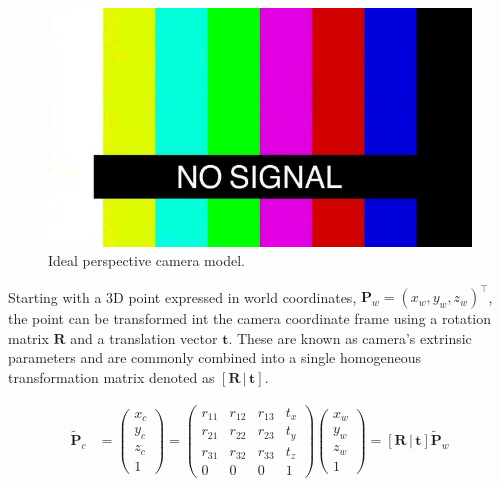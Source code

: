 \begin{figure}[h!]
    \centering
    \includegraphics[width=\linewidth]{images/shared/no_signal.jpg}
    \caption{Ideal perspective camera model.}
    \label{fig:pinhole_model}
\end{figure}

Starting with a 3D point expressed in world coordinates, $\mathbf{P}_w = \left(x_w, y_w, z_w\right)^\top$, the point can be transformed int the camera coordinate frame using a rotation matrix $\mathbf{R}$ and a translation vector $\mathbf{t}$. These are known as camera's extrinsic parameters and are commonly combined into a single homogeneous transformation matrix denoted as $\left[\mathbf{R} \,|\, \mathbf{t}\right]$.

\begin{align}
    \tilde{\mathbf{P}}_c 
    &=
    \begin{pmatrix}
        x_c \\
        y_c \\
        z_c \\
        1
    \end{pmatrix}
    =
    \begin{pmatrix}
        r_{11} & r_{12} & r_{13} & t_x \\
        r_{21} & r_{22} & r_{23} & t_y \\
        r_{31} & r_{32} & r_{33} & t_z \\
        0 & 0 & 0 & 1
    \end{pmatrix}
    \begin{pmatrix}
        x_w \\
        y_w \\
        z_w \\
        1
    \end{pmatrix}
    =
    \left[ \mathbf{R} \,|\, \mathbf{t} \right] \tilde{\mathbf{P}}_w 
\end{align}

